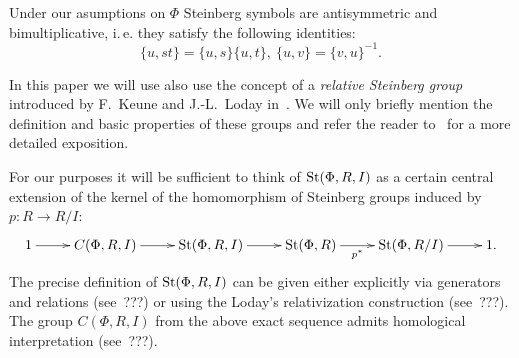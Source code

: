 
Under our asumptions on $\Phi$ Steinberg symbols are antisymmetric and bimultiplicative, i.\,e. they satisfy the following identities:
\begin{equation} \label{eq:symbol-properties} \{ u, st \} = \{ u, s\} \{ u, t \}, \ \{ u, v \} = \{ v, u\}^{-1}. \end{equation}

In this paper we will use also use the concept of a \textit{relative Steinberg group} introduced by F.~Keune and J.-L.~Loday in~\cite{Ke78, Lo78}.
We will only briefly mention the definition and basic properties of these groups and refer the reader to~\cite[\S~2.3]{LS20} for a more detailed exposition.

For our purposes it will be sufficient to think of $\operatorname{St}(\Phi, R, I)$ as a certain central extension of the kernel of the homomorphism of Steinberg groups induced by $p:R\to R/I$:
\begin{equation}
    \xymatrix{1 \ar[r] & C(\Phi, R, I) \ar[r] & \St(\Phi, R, I) \ar[r] & \St(\Phi, R) \ar[r]_-{p^*} & \St(\Phi, R/I) \ar[r] & 1. }\label{eq:relative-Steinberg}
\end{equation}
The precise definition of $\operatorname{St}(\Phi, R, I)$ can be given either explicitly via generators and relations (see~???)
 or using the Loday's relativization construction (see~???).
The group $C(\Phi, R, I)$ from the above exact sequence admits homological interpretation (see~???).


